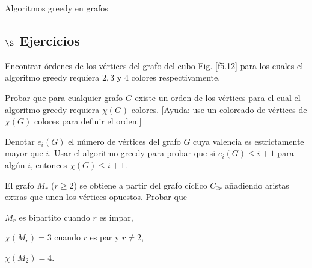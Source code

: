 \begin{section}{Algoritmos greedy en grafos}
\subsection*{$\S$ Ejercicios}\label{ejercicio5.7} 
\begin{enumex}
\item Encontrar órdenes de los vértices del grafo del cubo Fig. \ref{f5.12}  para los cuales el algoritmo greedy requiera $2, 3$ y $4$ colores respectivamente.
\item \label{ejercicio5.7.2} Probar que para cualquier grafo $G$ existe un orden de los vértices para el cual el algoritmo greedy requiera $\chi(G)$ colores. [Ayuda: use un coloreado de vértices de $\chi(G)$ colores para definir el orden.]
\item Denotar $e_i(G)$ el número de vértices del grafo $G$ cuya valencia es estrictamente mayor que $i$. Usar el algoritmo greedy para probar que si $e_i(G) \le i+1$ para algún $i$, entonces $\chi(G) \le
i+1$.
\item El grafo $M_r$ ($r\ge 2$) se obtiene a partir del grafo cíclico $C_{2r}$ añadiendo aristas extras que unen los vértices opuestos. Probar que 
\begin{enumex}
    \item $M_r$ es bipartito cuando $r$ es impar,
    
    \item $\chi(M_r)=3$ cuando $r$ es par y $r\not= 2$,
    
    \item $\chi(M_2)=4$.
\end{enumex}
\end{enumex}
\end{section}

